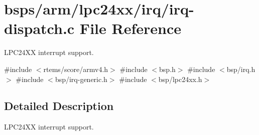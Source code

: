 \hypertarget{irq-dispatch_8c}{}\section{bsps/arm/lpc24xx/irq/irq-\/dispatch.c File Reference}
\label{irq-dispatch_8c}


L\+P\+C24\+XX interrupt support.  


{\ttfamily \#include $<$rtems/score/armv4.\+h$>$}\newline
{\ttfamily \#include $<$bsp.\+h$>$}\newline
{\ttfamily \#include $<$bsp/irq.\+h$>$}\newline
{\ttfamily \#include $<$bsp/irq-\/generic.\+h$>$}\newline
{\ttfamily \#include $<$bsp/lpc24xx.\+h$>$}\newline


\subsection{Detailed Description}
L\+P\+C24\+XX interrupt support. 

